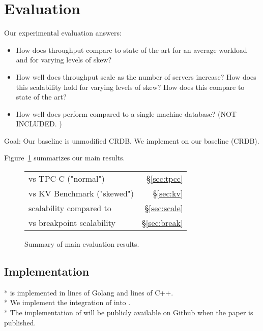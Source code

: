\section{Evaluation}
\label{sec:eval}

\newcommand{\mw}[1]{\note{green}{MW: #1}}

\iffalse
\name{} is designed to provide minimal commit latency for scalable,
geo-replicated databases under all levels of contention.
To understand
the advancement of \name{} we evaluate our implementation to answer
the following questions:
\fi
Our experimental evaluation answers:
\begin{itemize}
\item How does throughput compare to state of the art for an average workload and for varying levels of skew?
\item How well does throughput scale as the number of servers increase? How does this scalability hold for varying levels of skew? How does this compare to state of the art?
\item How well does \name perform compared to a single machine database? (NOT INCLUDED. )
\end{itemize}

Goal: Our baseline is unmodified CRDB. We implement \name{} on our baseline (CRDB).

Figure~\ref{fig:eval_summary} summarizes our main results.
\begin{figure}	
\begin{tabular}{@{}p{} r@{}}
\midrule
\name{} vs \dsdb{} TPC-C ("normal") & \S\ref{sec:tpcc}\\
\name{} vs \dsdb{} KV Benchmark ("skewed") & \S\ref{sec:kv}\\
\hline
\name{} scalability compared to \dsdb{} & \S\ref{sec:scale}\\
\name{} vs \dsdb{} breakpoint scalability & \S\ref{sec:break}\\
\midrule
\end{tabular}
\caption{Summary of main evaluation results.}
\label{fig:eval_summary}
\end{figure}

\subsection{Implementation}
* \name{} is implemented in  lines of Golang and  lines of C++.\\
* We implement the integration of \smdb{} into \dsdb{}.\\
* The implementation of \name{} will be publicly
  available on Github when the paper is published.


